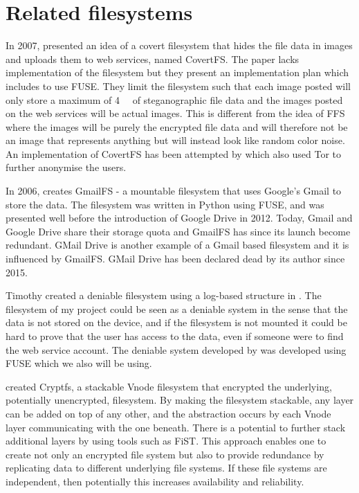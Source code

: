 \section{Related filesystems}
In 2007, \citeauthor{baliga2007web} presented an idea of a covert filesystem that hides the file data in images and uploads them to web services, named CovertFS\cite{baliga2007web}. The paper lacks implementation of the filesystem but they present an implementation plan which includes to use FUSE.  They limit the filesystem such that each image posted will only store a maximum of \SI{4}{\kilo\byte} of steganographic file data and the images posted on the web services will be actual images. This is different from the idea of FFS where the images will be purely the encrypted file data and will therefore not be an image that represents anything but will instead look like random color noise. An implementation of CovertFS has been attempted by \citeauthor{sosaSuperSecretFile2007} which also used Tor to further anonymise the users\cite{sosaSuperSecretFile2007}.

In 2006, \citeauthor{jonesGoogleHackUse2006} creates GmailFS - a mountable filesystem that uses Google's Gmail to store the data\cite{jonesGoogleHackUse2006}\cite{jonesGmailFilesystemImplementation2006}. The filesystem was written in Python using FUSE, and was presented well before the introduction of Google Drive in 2012. Today, Gmail and Google Drive share their storage quota and GmailFS has since its launch become redundant. GMail Drive is another example of a Gmail based filesystem and it is influenced by GmailFS\cite{viksoeViksoeDkGMail2004}. GMail Drive has been declared dead by its author since 2015.

Timothy \citeauthor{petersDEFYDeniableFile2014} created a deniable filesystem using a log-based structure in \citeyear{petersDEFYDeniableFile2014}\cite{petersDEFYDeniableFile2014}. The filesystem of my project could be seen as a deniable system in the sense that the data is not stored on the device, and if the filesystem is not mounted it could be hard to prove that the user has access to the data, even if someone were to find the web service account. The deniable system developed by \citeauthor{petersDEFYDeniableFile2014} was developed using FUSE\cite{Libfuse2021} which we also will be using.

\citeauthor{badulescuCryptfsStackableVnode1998} created Cryptfs, a stackable Vnode filesystem that encrypted the underlying, potentially unencrypted, filesystem\cite{badulescuCryptfsStackableVnode1998}. By making the filesystem stackable, any layer can be added on top of any other, and the abstraction occurs by each Vnode layer communicating with the one beneath. There is a potential to further stack additional layers by using tools such as FiST\cite{FiSTStackableFile}. This approach enables one to create not only an encrypted file system but also to provide redundance by replicating data to different
underlying file systems. If these file systems are independent, then potentially this increases availability and reliability.